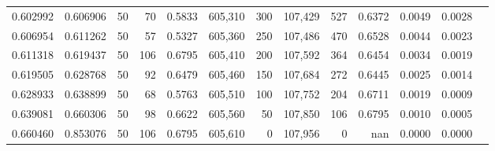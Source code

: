 \begin{tabular}{rrrrrrrrrrrrr}
0.602992 & 0.606906 &    50 &  70 &                                     0.5833 & 605,310 &     300 & 107,429 &     527 & 0.6372 & 0.0049 & 0.0028 \\
0.606954 & 0.611262 &    50 &  57 &                                     0.5327 & 605,360 &     250 & 107,486 &     470 & 0.6528 & 0.0044 & 0.0023 \\
0.611318 & 0.619437 &    50 & 106 &                                     0.6795 & 605,410 &     200 & 107,592 &     364 & 0.6454 & 0.0034 & 0.0019 \\
0.619505 & 0.628768 &    50 &  92 &                                     0.6479 & 605,460 &     150 & 107,684 &     272 & 0.6445 & 0.0025 & 0.0014 \\
0.628933 & 0.638899 &    50 &  68 &                                     0.5763 & 605,510 &     100 & 107,752 &     204 & 0.6711 & 0.0019 & 0.0009 \\
0.639081 & 0.660306 &    50 &  98 &                                     0.6622 & 605,560 &      50 & 107,850 &     106 & 0.6795 & 0.0010 & 0.0005 \\
0.660460 & 0.853076 &    50 & 106 &                                     0.6795 & 605,610 &       0 & 107,956 &       0 &    nan & 0.0000 & 0.0000 \\
\bottomrule
\end{tabular}
